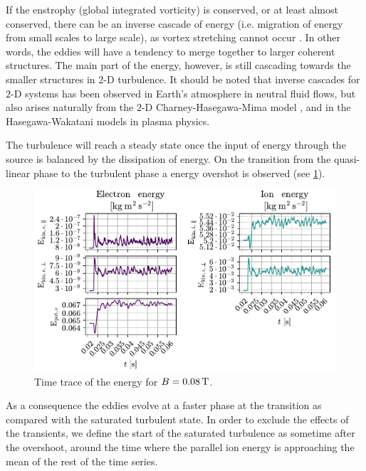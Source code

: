 If the enstrophy (global integrated vorticity) is conserved, or at least almost conserved, there can be an inverse cascade of energy (i.e. migration of energy from small scales to large scale), as vortex stretching cannot occur \cite{Fjortoft1953}.
In other words, the eddies will have a tendency to merge together to larger coherent structures.
The main part of the energy, however, is still cascading towards the smaller structures in $2$-D turbulence.
It should be noted that inverse cascades for $2$-D systems has been observed in Earth's atmosphere \cite{Smith2002} in neutral fluid flows, but also arises naturally from the $2$-D Charney-Hasegawa-Mima model \cite{Boffetta2002}, and in the Hasegawa-Wakatani \cite{Manz2009} models in plasma physics.

The turbulence will reach a steady state once the input of energy through the source is balanced by the dissipation of energy.
On the transition from the quasi-linear phase to the turbulent phase a energy overshot is observed (see \cref{fig:energyTrace008}).
%
\begin{figure}[htb]
    \centering
    \includegraphics{fig/results/energyTrace/energyTraceB008}
    \caption{Time trace of the energy for $B=0.08\, \text{T}$.}
    \label{fig:energyTrace008}
\end{figure}
%
As a consequence the eddies evolve at a faster phase at the transition as compared with the saturated turbulent state.
In order to exclude the effects of the transients, we define the start of the saturated turbulence as sometime after the overshoot, around the time where the parallel ion energy is approaching the mean of the rest of the time series.

